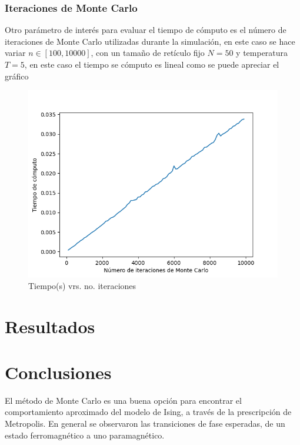 \documentclass[a4paper]{article}
\begin{document}
\subsubsection{Iteraciones de Monte Carlo}
Otro parámetro de interés para evaluar el tiempo de cómputo es el número de iteraciones de Monte Carlo utilizadas durante la simulación, en este caso se hace variar $n\in [100,10000]$, con un tamaño de retículo fijo $N=50$ y temperatura $T=5$, en este caso el tiempo se cómputo es lineal como se puede apreciar el gráfico
\begin{figure}[H]
\begin{center}
\includegraphics[scale=0.6]{time_vrs_MC_iterations.png} 
\end{center} 
\caption{Tiempo(s) vrs. no. iteraciones}
\end{figure}

\section{Resultados}

\section{Conclusiones}
El método de Monte Carlo es una buena opción para encontrar el comportamiento aproximado del modelo de Ising, a través de la prescripción de Metropolis. En general se observaron las transiciones de fase esperadas, de un estado ferromagnético a uno paramagnético.
\end{document}
